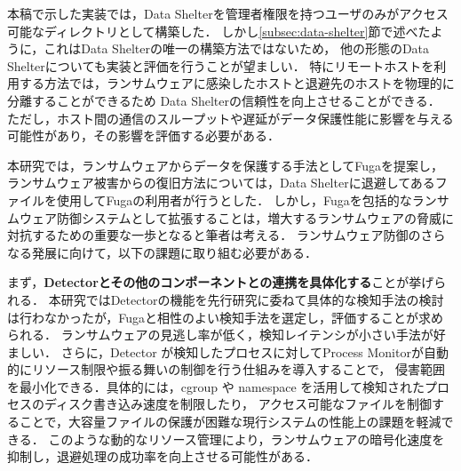 本稿で示した実装では，Data Shelterを管理者権限を持つユーザのみがアクセス可能なディレクトリとして構築した．
しかし\ref{subsec:data-shelter}節で述べたように，これはData Shelterの唯一の構築方法ではないため，
他の形態のData Shelterについても実装と評価を行うことが望ましい．
特にリモートホストを利用する方法では，ランサムウェアに感染したホストと退避先のホストを物理的に分離することができるため
Data Shelterの信頼性を向上させることができる．
ただし，ホスト間の通信のスループットや遅延がデータ保護性能に影響を与える可能性があり，その影響を評価する必要がある．

本研究では，ランサムウェアからデータを保護する手法としてFugaを提案し，
ランサムウェア被害からの復旧方法については，Data Shelterに退避してあるファイルを使用してFugaの利用者が行うとした．
しかし，Fugaを包括的なランサムウェア防御システムとして拡張することは，増大するランサムウェアの脅威に対抗するための重要な一歩となると筆者は考える．
ランサムウェア防御のさらなる発展に向けて，以下の課題に取り組む必要がある．

まず，\textbf{Detectorとその他のコンポーネントとの連携を具体化する}ことが挙げられる．
本研究ではDetectorの機能を先行研究に委ねて具体的な検知手法の検討は行わなかったが，Fugaと相性のよい検知手法を選定し，評価することが求められる．
ランサムウェアの見逃し率が低く，検知レイテンシが小さい手法が好ましい．
% 
さらに，Detector が検知したプロセスに対してProcess Monitorが自動的にリソース制限や振る舞いの制御を行う仕組みを導入することで，
侵害範囲を最小化できる．具体的には，cgroup や namespace を活用して検知されたプロセスのディスク書き込み速度を制限したり，
アクセス可能なファイルを制御することで，大容量ファイルの保護が困難な現行システムの性能上の課題を軽減できる．
このような動的なリソース管理により，ランサムウェアの暗号化速度を抑制し，退避処理の成功率を向上させる可能性がある．
